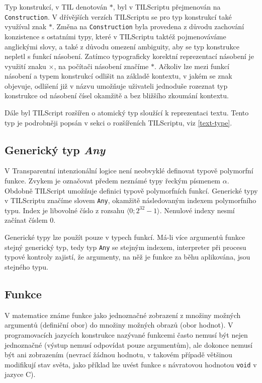 Typ konstrukcí, v TIL denotován $*$, byl v TILScriptu přejmenován na \lstinline{Construction}.
V dřívějších verzích TILScriptu se pro typ konstrukcí také využíval znak $*$. Změna na
\lstinline{Construction} byla provedena z důvodu zachování konzistence s ostatními typy, které
v TILScriptu taktéž pojmenováváme anglickými slovy, a také z důvodu omezení ambiguity, aby se typ
konstrukce nepletl s funkcí násobení. Zatímco typograficky korektní reprezentací násobení je
využití znaku $\times$, na počítači násobení značíme $*$. Ačkoliv lze mezi funkcí násobení a
typem konstrukcí odlišit na základě kontextu, v jakém se znak objevuje, odlišení již v názvu
umožňuje uživateli jednoduše rozeznat typ konstrukce od násobení čísel okamžitě a bez bližšího
zkoumání kontextu.

Dále byl TILScript rozšířen o atomický typ sloužící k reprezentaci textu. Tento typ je podrobněji
popsán v sekci o rozšířeních TILScriptu, viz \ref{text-type}.

\subsection{Generický typ \textit{Any}}

V Transparentní intenzionální logice není neobvyklé definovat typově polymorfní funkce. Zvykem je
označovat předem neznámé typy řeckým písmenem $\alpha$. Obdobně TILScript umožňuje definici
typově polymorfních funkcí. Generické typy v TILScriptu značíme slovem \lstinline{Any}, okamžitě
následovaným indexem polymorfního typu. Index je libovolné číslo z rozsahu
$\bigl \langle 0; 2^{32}-1 \bigr \rangle$. Nenulové indexy nesmí začínat číslem 0.

Generické typy lze použít pouze v typech funkcí. Má-li více argumentů funkce stejný generický
typ, tedy typ \lstinline{Any} se stejným indexem, interpreter při procesu typové kontroly zajistí,
že argumenty, na něž je funkce za běhu aplikována, jsou stejného typu.

\subsection{Funkce}

V matematice známe funkce jako jednoznačné zobrazení z množiny možných argumentů (definiční obor)
do množiny možných obrazů (obor hodnot). V programovacích jazycích konstrukce nazývané funkcemi
často nemusí být nejen jednoznačné (výstup nemusí odpovídat pouze argumentům), ale dokonce nemusí
být ani zobrazením (nevrací žádnou hodnotu, v takovém případě většinou modifikují stav světa,
jako příklad lze uvést funkce s návratovou hodnotou \lstinline{void} v jazyce C).

